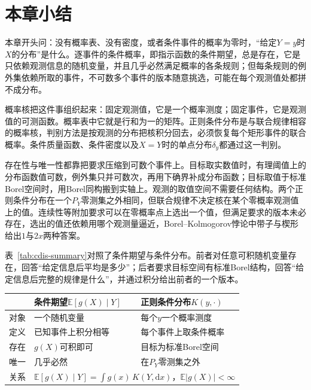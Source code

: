 \section{本章小结}
\label{sec:cdis-summary}

本章开头问：没有概率表、没有密度，或者条件事件的概率为零时，“给定$Y=y$时$X$的分布”是什么。逐事件的条件概率，即指示函数的条件期望，总是存在，它是只依赖观测信息的随机变量，并且几乎必然满足概率的各条规则；但每条规则的例外集依赖所取的事件，不可数多个事件的版本随意挑选，可能在每个观测值处都拼不成分布。

概率核把这件事组织起来：固定观测值，它是一个概率测度；固定事件，它是观测值的可测函数。概率表中它就是行和为一的矩阵。正则条件分布是与联合规律相容的概率核，判别方法是按观测的分布把核积分回去，必须恢复每个矩形事件的联合概率。条件质量函数、条件密度以及$X=Y$时的单点分布$\delta_y$都通过这一判别。

存在性与唯一性都靠把要求压缩到可数个事件上。目标取实数值时，有理阈值上的分布函数值可数，例外集只并可数次，再用下确界补成分布函数；目标取值于标准Borel空间时，用Borel同构搬到实轴上。观测的取值空间不需要任何结构。两个正则条件分布在一个$P_Y$零测集之外相同，但联合规律不决定核在某个零概率观测值上的值。连续性等附加要求可以在零概率点上选出一个值，但满足要求的版本未必存在，选出的值还依赖用哪个观测量逼近，Borel--Kolmogorov悖论中带子与楔形给出$1$与$2x$两种答案。

表~\ref{tab:cdis-summary}对照了条件期望与条件分布。前者对任意可积随机变量存在，回答“给定信息后平均是多少”；后者要求目标空间有标准Borel结构，回答“给定信息后完整的规律是什么”，并通过积分给出前者的一个版本。

\begin{BookInlineTable}
  \centering
  \caption{条件期望与正则条件分布的对照}
  \label{tab:cdis-summary}
  \begin{tabular}{lll}
    \toprule
    & 条件期望$\mathbb{E}[g(X)\mid Y]$ & 正则条件分布$K(y,\cdot)$ \\
    \midrule
    对象 & 一个随机变量 & 每个$y$一个概率测度 \\
    定义 & 已知事件上积分相等 & 每个事件上取条件概率 \\
    存在 & $g(X)$可积即可 & 目标为标准Borel空间 \\
    唯一 & 几乎必然 & 在$P_Y$零测集之外 \\
    关系 & \multicolumn{2}{c}{$\mathbb{E}[g(X)\mid Y]=\int g(x)\,K(Y,\mathrm{d}x)$，$\mathbb{E}\lvert g(X)\rvert<\infty$} \\
    \bottomrule
  \end{tabular}
\end{BookInlineTable}

